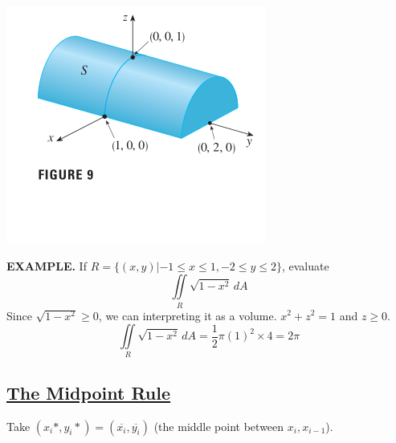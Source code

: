 \documentclass{article}
\begin{document}
\begin{minipage}[]{0.3\linewidth}
  \includegraphics[width = 4.3 cm]{./images/cylinder.png}
  
\end{minipage}
\begin{minipage}[]{0.67\linewidth}
{\selectfont \textbf{\textcolor{blue5}{ EXAMPLE.}}} If $R = \{(x,y) | -1 \le x \le 1, -2 \le y \le 2 \}$, evaluate 
\begin{equation*}
 \iint \limits_{R} \sqrt{1 - x^2 }\, dA 
\end{equation*}
Since $\sqrt{1 - x^2 } \ge 0 $, we can interpreting it as a volume. $x^2 + z^2 = 1$ and $z \ge 0$.
\[\iint \limits_{R} \sqrt{1 - x^2 }\, dA = \frac{1}{2} \pi (1)^2 \times 4 = 2 \pi\]
  
\end{minipage}

\subsection*{{\selectfont \textcolor{blue5}{ \underline{The Midpoint Rule}}}}
Take $(x_i*, y_i*) = (\overline{x_i}, \overline{y_i})$ (the middle point between $x_i, x_{i-1}$).
\end{document}
